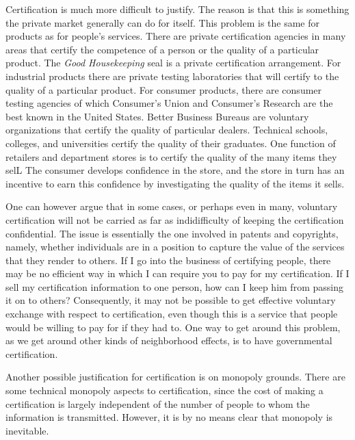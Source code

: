 \documentclass[11pt,openany]{book}
\begin{document}
Certification is much more difficult to justify. The reason is that this is something the private market generally can do for itself. This problem is the same for products as for people's services. There are private certification agencies in many areas that certify the competence of a person or the quality of a particular product. The \emph{Good Housekeeping} seal is a private certification arrangement. For industrial products there are private testing laboratories that will certify to the quality of a particular product. For consumer products, there are consumer testing agencies of which Consumer's Union and Consumer's Research are the best known in the United States. Better Business Bureaus are voluntary organizations that certify the quality of particular dealers. Technical schools, colleges, and universities certify the quality of their graduates. One function of retailers and department stores is to certify the quality of the many items they selL The consumer develops confidence in the store, and the store in turn has an incentive to earn this confidence by investigating the quality of the items it sells.

One can however argue that in some cases, or perhaps even in many, voluntary certification will not be carried as far as indidifficulty of keeping the certification confidential. The issue is essentially the one involved in patents and copyrights, namely, whether individuals are in a position to capture the value of the services that they render to others. If I go into the business of certifying people, there may be no efficient way in which I can require you to pay for my certification. If I sell my certification information to one person, how can I keep him from passing it on to others? Consequently, it may not be possible to get effective voluntary exchange with respect to certification, even though this is a service that people would be willing to pay for if they had to. One way to get around this problem, as we get around other kinds of neighborhood effects, is to have governmental certification.

Another possible justification for certification is on monopoly grounds. There are some technical monopoly aspects to certification, since the cost of making a certification is largely independent of the number of people to whom the information is transmitted. However, it is by no means clear that monopoly is inevitable.
\end{document}
